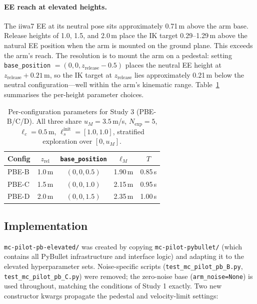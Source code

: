 \paragraph{EE reach at elevated heights.}
The iiwa7 EE at its neutral pose sits approximately 0.71\,m above the arm base.
Release heights of 1.0, 1.5, and 2.0\,m place the IK target 0.29--1.29\,m above
the natural EE position when the arm is mounted on the ground plane.
This exceeds the arm's reach.
The resolution is to mount the arm on a pedestal: setting \texttt{base\_position}
$= (0, 0, z_{\mathrm{release}} - 0.5)$ places the neutral EE height at
$z_{\mathrm{release}} + 0.21$\,m, so the IK target at $z_{\mathrm{release}}$ lies
approximately 0.21\,m below the neutral configuration---well within the arm's
kinematic range.
Table~\ref{tab:pbe_configs} summarises the per-height parameter choices.

\begin{table}[h]
  \centering
  \caption{Per-configuration parameters for Study 3 (PBE-B/C/D).
           All three share $u_M = 3.5$\,m/s, $N_{\mathrm{exp}} = 5$,
           $\ell_c = 0.5$\,m, $\ell_s^{\mathrm{init}} = [1.0, 1.0]$,
           stratified exploration over $[0, u_M]$.}
  \label{tab:pbe_configs}
  \begin{tabular}{lcccc}
    \toprule
    Config & $z_{\mathrm{rel}}$ & \texttt{base\_position} & $\ell_M$ & $T$ \\
    \midrule
    PBE-B & 1.0\,m & $(0, 0, 0.5)$  & 1.90\,m & 0.85\,s \\
    PBE-C & 1.5\,m & $(0, 0, 1.0)$  & 2.15\,m & 0.95\,s \\
    PBE-D & 2.0\,m & $(0, 0, 1.5)$  & 2.35\,m & 1.00\,s \\
    \bottomrule
  \end{tabular}
\end{table}

\subsection{Implementation}
\label{sec:study3:impl}

\texttt{mc-pilot-pb-elevated/} was created by copying \texttt{mc-pilot-pybullet/}
(which contains all PyBullet infrastructure and interface logic) and adapting it to the elevated hyperparameter
sets.
Noise-specific scripts (\texttt{test\_mc\_pilot\_pb\_B.py},
\texttt{test\_mc\_pilot\_pb\_C.py}) were removed; the zero-noise base
(\texttt{arm\_noise=None}) is used throughout, matching the conditions of Study 1
exactly.
Two new constructor kwargs propagate the pedestal and velocity-limit settings:

